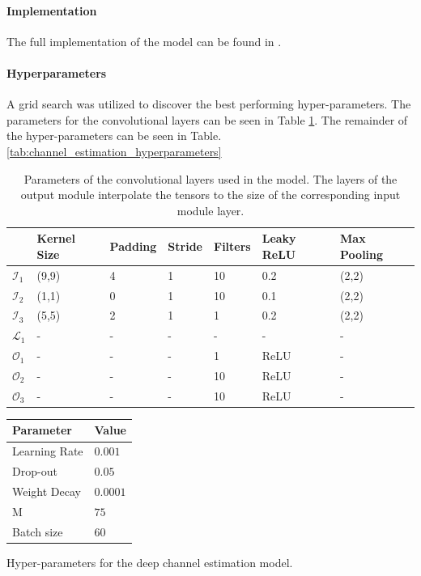\paragraph{Implementation}
The full implementation of the model can be found in \cite{Thrane2020RepositoryLearning}.


\paragraph{Hyperparameters}
A grid search was utilized to discover the best performing hyper-parameters. The parameters for the convolutional layers can be seen in Table \ref{tab:channel_estimation_hyperparameters_conv}. The remainder of the hyper-parameters can be seen in Table. \ref{tab:channel_estimation_hyperparameters}


\begin{table}[]
\footnotesize{
\begin{tabular}{@{}lllllll@{}}
\toprule
 & Kernel Size & Padding & Stride & Filters & Leaky ReLU & Max Pooling \\ \midrule
$\mathcal{I}_1$            & (9,9)       & 4       & 1      & 10      & 0.2        & (2,2)       \\
$\mathcal{I}_2$              & (1,1)       & 0       & 1      & 10      & 0.1        & (2,2)       \\
$\mathcal{I}_3$            & (5,5)       & 2       & 1      & 1       & 0.2        & (2,2)       \\
$\mathcal{L}_1$              & -           & -       & -      & -      & -          & -           \\
$\mathcal{O}_1$              & -           & -       & -      & 1       & ReLU       & -           \\
$\mathcal{O}_2$               & -           & -       & -      & 10      & ReLU       & -           \\
$\mathcal{O}_3$               & -           & -       & -      & 10      & ReLU       & -           \\ \bottomrule
\end{tabular}
\vspace{2em}
\caption{Parameters of the convolutional layers used in the model. The layers of the output module interpolate the tensors to the size of the corresponding input module layer.}\label{tab:channel_estimation_hyperparameters_conv}
}
\end{table}

\begin{margintable}
\begin{tabular}{@{}ll@{}}
Parameter     & Value  \\ \midrule
Learning Rate & $0.001$  \\
Drop-out      & $0.05$   \\
Weight Decay  & $0.0001$ \\
M             & $75$     \\
Batch size    & $60$    \\ \bottomrule
\end{tabular}
\caption{Hyper-parameters for the deep channel estimation model.}\label{tab:channel_estimation_hyperparameters}
\end{margintable}

